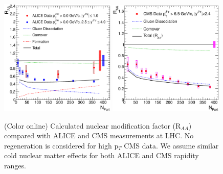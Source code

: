 \documentclass[aps,prc,preprint,superscriptaddress,showpacs,showkeys]{revtex4-1}
\begin{document}
\begin{figure}
\includegraphics[width=0.49\textwidth]{ALICE_RAA.eps}
\includegraphics[width=0.49\textwidth]{CMS_RAA_JPsi.eps}
\caption{(Color online) Calculated nuclear modification factor (R$_{AA}$) compared with ALICE and CMS measurements at LHC. No regeneration is 
considered for high p$_{T}$ CMS data. We assume similar cold nuclear matter effects for both ALICE and CMS rapidity ranges.}
\label{fig:JPsiRaa}
\end{figure}


\end{document}
